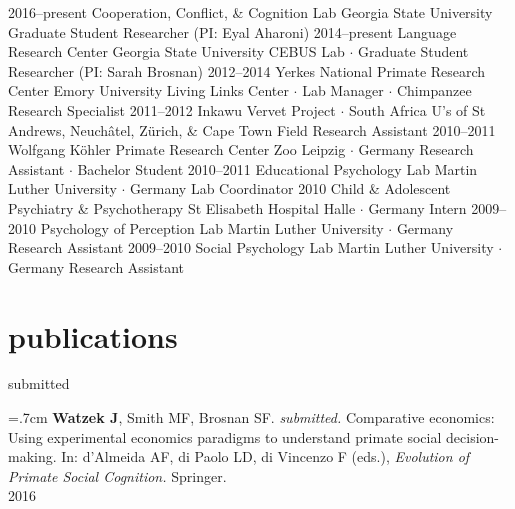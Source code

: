 \documentclass[]{friggeri-cv}
\begin{document}
\begin{entrylist}
  \entry
    {2016--present}
    {Cooperation, Conflict, \& Cognition Lab}
    {Georgia State University}
    {Graduate Student Researcher (PI: Eyal Aharoni)}
  \entry
    {2014--present}
    {Language Research Center}
    {Georgia State University}
    {CEBUS Lab $\cdot$ Graduate Student Researcher (PI: Sarah Brosnan)}
  \entry
    {2012--2014}
    {Yerkes National Primate Research Center}
    {Emory University}
    {Living Links Center $\cdot$ Lab Manager $\cdot$ Chimpanzee Research Specialist}
  \entry
    {2011--2012}
    {Inkawu Vervet Project $\cdot$ South Africa}
    {U's of St Andrews, Neuch\^{a}tel, Z\"urich, \& Cape Town}
    {Field Research Assistant}
  \entry
    {2010--2011}
    {Wolfgang K\"{o}hler Primate Research Center}
    {Zoo Leipzig $\cdot$ Germany}
    {Research Assistant $\cdot$ Bachelor Student}
  \entry
    {2010--2011}
    {Educational Psychology Lab}
    {Martin Luther University $\cdot$ Germany}
    {Lab Coordinator}
  \entry
    {2010}
    {Child \& Adolescent Psychiatry \& Psychotherapy}
    {St Elisabeth Hospital Halle $\cdot$ Germany}
    {Intern}
  \entry
    {2009--2010}
    {Psychology of Perception Lab}
    {Martin Luther University $\cdot$ Germany}
    {Research Assistant}
  \entry
    {2009--2010}
    {Social Psychology Lab}
    {Martin Luther University $\cdot$ Germany}
    {Research Assistant}
\end{entrylist}


\newpage
\thispagestyle{fancy}

\section{publications}

{\large{} submitted}

\hangindent=.7cm \textbf{Watzek J}, Smith MF, Brosnan SF. \emph{submitted.} Comparative economics: Using experimental economics paradigms to understand primate social decision-making. In: d'Almeida AF, di Paolo LD, di Vincenzo F (eds.), \emph{Evolution of Primate Social Cognition.} Springer.\\[-.1cm]

{\large{} 2016}
\end{document}
